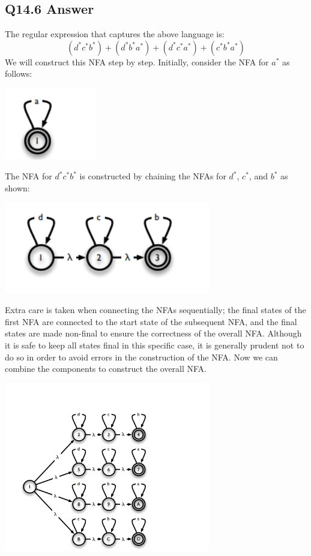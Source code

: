 \documentclass{article}
\begin{document}
\subsection*{Q14.6 Answer}
The regular expression that captures the above language is:
\[(d^*c^*b^*)+(d^*b^*a^*)+(d^*c^*a^*)+(c^*b^*a^*)\]
We will construct this NFA step by step. Initially, consider the NFA for \( a^* \) as follows:
\begin{center}
    \includegraphics[width=4cm]{10.png}
\end{center}
The NFA for \( d^*c^*b^* \) is constructed by chaining the NFAs for \( d^* \), \( c^* \), and \( b^* \) as shown:
\begin{center}
    \includegraphics[width=9cm]{11.png}
\end{center}
Extra care is taken when connecting the NFAs sequentially; the final states of the first NFA are connected to the start state of the subsequent NFA, and the final states are made non-final to ensure the correctness of the overall NFA. Although it is safe to keep all states final in this specific case, it is generally prudent not to do so in order to avoid errors in the construction of the NFA.
Now we can combine the components to construct the overall NFA.
\begin{center}
    \includegraphics[width=9cm]{12.png}
\end{center}
\newpage
\end{document}

